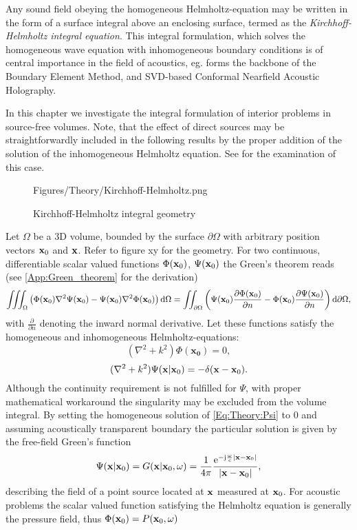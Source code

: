 Any sound field obeying the homogeneous Helmholtz-equation may be written in the form of a surface integral above an enclosing surface, termed as the \emph{Kirchhoff-Helmholtz integral equation}. This integral formulation, which solves the homogeneous wave equation with inhomogeneous boundary conditions is of central importance in the field of acoustics, eg. forms the backbone of the Boundary Element Method, and SVD-based Conformal Nearfield Acoustic Holography.

In this chapter we investigate the integral formulation of interior problems in source-free volumes.
Note, that the effect of direct sources may be straightforwardly included in the following results by the proper addition of the solution of the inhomogeneous Helmholtz equation. See \cite{Spors2005} for the examination of this case.
\begin{figure}[!h]
	\centering
	\begin{overpic}[width = .65\columnwidth]{Figures/Theory/Kirchhoff-Helmholtz.png}
	\end{overpic}
\caption{Kirchhoff-Helmholtz integral geometry}
	\label{Fig:Theory:HIE_geometry}
\end{figure}

Let $\Omega$ be a 3D volume, bounded by the surface $\partial \Omega$ with arbitrary position vectors $\mathbf{x}_0$ and $\mathbf{x}$. Refer to figure xy for the geometry. For two continuous, differentiable scalar valued functions $\Phi(\mathbf{x}_0)$, $\Psi(\mathbf{x}_0)$ the Green's theorem reads (see \ref{App:Green_theorem} for the derivation)
\begin{equation}
\iiint_{\Omega}          \left(  \Phi(\mathbf{x}_0) \nabla^2 \Psi(\mathbf{x}_0) - \Psi(\mathbf{x}_0) \nabla^2 \Phi(\mathbf{x}_0)   \right)   \mathrm{d} \Omega = 
\iint_{\partial \Omega}  \left(  \Psi(\mathbf{x}_0) \frac{\partial \Phi(\mathbf{x}_0)}{\partial n}  - \Phi(\mathbf{x}_0) \frac{\partial \Psi(\mathbf{x}_0)}{\partial n}  \right)   \mathrm{d} \partial \Omega,
\label{Eq:Theory:Greens-theorem}
\end{equation}
with $\frac{\partial}{\partial n}$ denoting the inward normal derivative. Let these functions satisfy the homogeneous and inhomogeneous Helmholtz-equations:
\begin{equation}
(\nabla^2 + k^2)\Phi(\mathbf{x_0}) = 0,
\label{Eq:Theory:Phi}
\end{equation}
\begin{equation}
(\nabla^2 + k^2)\Psi(\mathbf{x}|\mathbf{x}_0) = -\delta(\mathbf{x} - \mathbf{x}_0).
\label{Eq:Theory:Psi}
\end{equation}
Although the continuity requirement is not fulfilled for $\Psi$, with proper mathematical workaround the singularity may be excluded from the volume integral\cite{Williams1999}. By setting the homogeneous solution of \eqref{Eq:Theory:Psi} to 0 and assuming acoustically transparent boundary the particular solution is given by the free-field Green's function
\begin{equation}
\Psi(\mathbf{x} | \mathbf{x}_0) = G(\mathbf{x}| \mathbf{x}_0,\omega) = \frac{1}{4\pi} \frac{\mathrm{e}^{-\mathrm{j} \frac{\omega}{c} |\mathbf{x}-\mathbf{x}_0|}}{|\mathbf{x}-\mathbf{x}_0|},
\end{equation}
describing the field of a point source located at $\mathbf{x}$ measured at $\mathbf{x}_0$. For acoustic problems the scalar valued function satisfying the Helmholtz equation is generally the pressure field, thus $\Phi(\mathbf{x}_0) = P(\mathbf{x}_0,\omega) $
 
